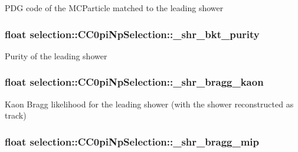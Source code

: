 P\-D\-G code of the M\-C\-Particle matched to the leading shower \hypertarget{classselection_1_1CC0piNpSelection_a1da68886d5b7a5b4eb1785649c48e8ef}{
\subsubsection[{\-\_\-shr\-\_\-bkt\-\_\-purity}]{\setlength{\rightskip}{0pt plus 5cm}float selection\-::\-C\-C0pi\-Np\-Selection\-::\-\_\-shr\-\_\-bkt\-\_\-purity\hspace{0.3cm}{\ttfamily [private]}}}\label{classselection_1_1CC0piNpSelection_a1da68886d5b7a5b4eb1785649c48e8ef}
Purity of the leading shower \hypertarget{classselection_1_1CC0piNpSelection_a0fae2cdec5a695421cbe2fdfe6e61c9d}{
\subsubsection[{\-\_\-shr\-\_\-bragg\-\_\-kaon}]{\setlength{\rightskip}{0pt plus 5cm}float selection\-::\-C\-C0pi\-Np\-Selection\-::\-\_\-shr\-\_\-bragg\-\_\-kaon\hspace{0.3cm}{\ttfamily [private]}}}\label{classselection_1_1CC0piNpSelection_a0fae2cdec5a695421cbe2fdfe6e61c9d}
Kaon Bragg likelihood for the leading shower (with the shower reconstructed as track) \hypertarget{classselection_1_1CC0piNpSelection_ae18587d33433c508bd3e371de8db7b32}{
\subsubsection[{\-\_\-shr\-\_\-bragg\-\_\-mip}]{\setlength{\rightskip}{0pt plus 5cm}float selection\-::\-C\-C0pi\-Np\-Selection\-::\-\_\-shr\-\_\-bragg\-\_\-mip\hspace{0.3cm}{\ttfamily [private]}}}\label{classselection_1_1CC0piNpSelection_ae18587d33433c508bd3e371de8db7b32}
